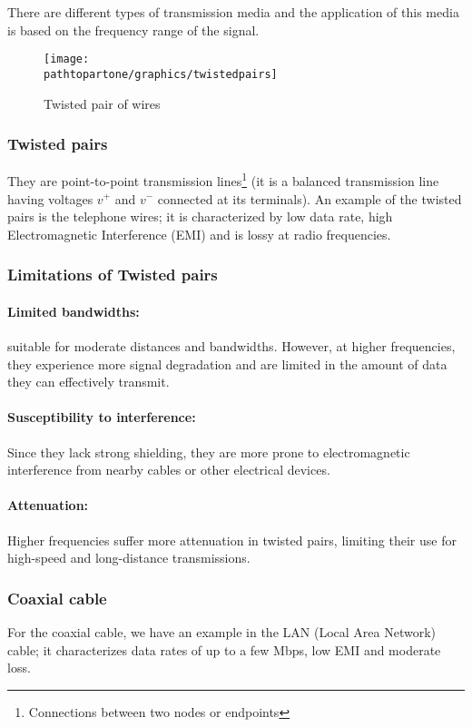 There are different types of transmission media and the application of this media is based on the frequency range of the signal.
\begin{figure}[h]
\centering
\texttt{[image: \\pathtopartone/graphics/twistedpairs]}
\caption{Twisted pair of wires}
\end{figure} 

\subsubsection{Twisted pairs}
They are point-to-point transmission lines\footnote{
Connections between two nodes or endpoints
} (it is a balanced transmission line having voltages $v^{+}$ and $v^{-}$ connected at its terminals). An example of the twisted pairs is the telephone wires; it is characterized by low data rate, high Electromagnetic Interference (EMI) and is lossy at radio frequencies.

\subsubsection{Limitations of Twisted pairs}
\paragraph{Limited bandwidths:} suitable for moderate distances and bandwidths.  However, at higher frequencies, they experience more signal degradation and are limited in the amount of data they can effectively transmit.

\paragraph{Susceptibility to interference:} Since they lack strong shielding, they are more prone to electromagnetic interference from nearby cables or other electrical devices.

\paragraph{Attenuation:} Higher frequencies suffer more attenuation in twisted pairs, limiting their use for high-speed and long-distance transmissions.

\subsubsection{Coaxial cable}
For the coaxial cable, we have an example in the LAN (Local Area Network) cable; it characterizes data rates of up to a few Mbps, low EMI and moderate loss.

